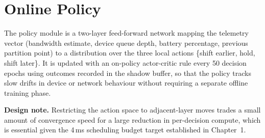 \section{Online Policy}

The policy module is a two-layer feed-forward network mapping the telemetry vector (bandwidth estimate, device queue depth, battery percentage, previous partition point) to a distribution over the three local actions \{shift earlier, hold, shift later\}. It is updated with an on-policy actor-critic rule every 50 decision epochs using outcomes recorded in the shadow buffer, so that the policy tracks slow drifts in device or network behaviour without requiring a separate offline training phase.

\begin{notebox}
\textbf{Design note.} Restricting the action space to adjacent-layer moves trades a small amount of convergence speed for a large reduction in per-decision compute, which is essential given the 4\,ms scheduling budget target established in Chapter~1.
\end{notebox}
